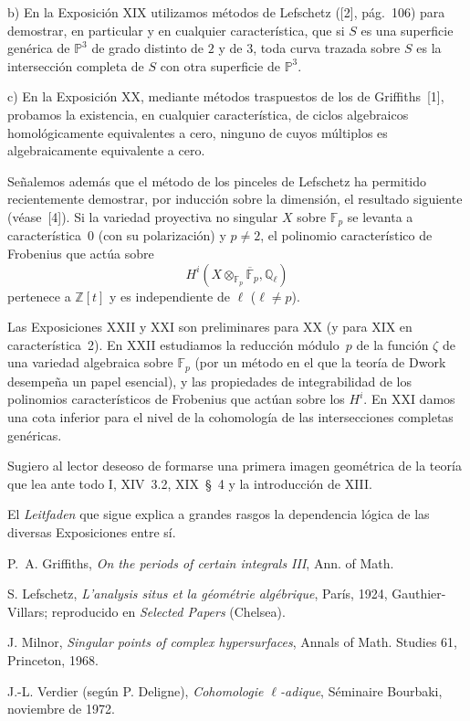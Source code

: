 \noindent\textup{b)} En la Exposición XIX utilizamos métodos de Lefschetz ([2], pág.~106) para demostrar, en particular y en cualquier característica, que si $S$ es una superficie genérica de $\mathbb{P}^{3}$ de grado distinto de $2$ y de $3$, toda curva trazada sobre $S$ es la intersección completa de $S$ con otra superficie de $\mathbb{P}^{3}$.

\noindent\textup{c)} En la Exposición XX, mediante métodos traspuestos de los de Griffiths~[1], probamos la existencia, en cualquier característica, de ciclos algebraicos homológicamente equivalentes a cero, ninguno de cuyos múltiplos es algebraicamente equivalente a cero.

Señalemos además que el método de los pinceles de Lefschetz ha permitido recientemente demostrar, por inducción sobre la dimensión, el resultado siguiente (véase~[4]). Si la variedad proyectiva no singular $X$ sobre $\mathbb{F}_p$ se levanta a característica~0 (con su polarización) y $p\neq 2$, el polinomio característico de Frobenius que actúa sobre
\[
H^i\!\left(X\otimes_{\mathbb{F}_p}\overline{\mathbb{F}}_p,\mathbb{Q}_\ell\right)
\]
pertenece a $\mathbb{Z}[t]$ y es independiente de $\ell$ ($\ell\neq p$).

Las Exposiciones XXII y XXI son preliminares para XX (y para XIX en característica~2). En XXII estudiamos la reducción módulo~$p$ de la función $\zeta$ de una variedad algebraica sobre $\mathbb{F}_p$ (por un método en el que la teoría de Dwork desempeña un papel esencial), y las propiedades de integrabilidad de los polinomios característicos de Frobenius que actúan sobre los $H^i$. En XXI damos una cota inferior para el nivel de la cohomología de las intersecciones completas genéricas.

Sugiero al lector deseoso de formarse una primera imagen geométrica de la teoría que lea ante todo I, XIV~3.2, XIX~§~4 y la introducción de XIII.

El \emph{Leitfaden} que sigue explica a grandes rasgos la dependencia lógica de las diversas Exposiciones entre sí.

\clearpage
\noindent[1]\quad P.~A. Griffiths, \emph{On the periods of certain integrals III}, Ann. of Math.\par
\medskip
\noindent[2]\quad S. Lefschetz, \emph{L'analysis situs et la géométrie algébrique}, París, 1924, Gauthier-Villars; reproducido en \emph{Selected Papers} (Chelsea).\par
\medskip
\noindent[3]\quad J. Milnor, \emph{Singular points of complex hypersurfaces}, Annals of Math. Studies 61, Princeton, 1968.\par
\medskip
\noindent[4]\quad J.-L. Verdier (según P. Deligne), \emph{Cohomologie $\ell$-adique}, Séminaire Bourbaki, noviembre de 1972.\par

